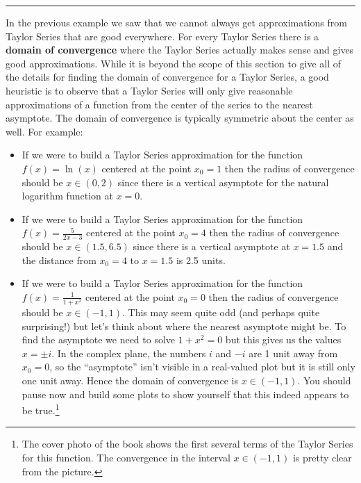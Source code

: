 \documentclass[
]{book}
\providecommand{\tightlist}{%
  \setlength{\itemsep}{0pt}\setlength{\parskip}{0pt}}
\theoremstyle{definition}
\theoremstyle{definition}
\theoremstyle{definition}
\theoremstyle{remark}
\begin{document}
\begin{center}\rule{0.5\linewidth}{0.5pt}\end{center}

In the previous example we saw that we cannot always get approximations from Taylor Series that are good everywhere. For every Taylor Series there is a \textbf{domain of convergence} where the Taylor Series actually makes sense and gives good approximations. While it is beyond the scope of this section to give all of the details for finding the domain of convergence for a Taylor Series, a good heuristic is to observe that a Taylor Series will only give reasonable approximations of a function from the center of the series to the nearest asymptote. The domain of convergence is typically symmetric about the center as well. For example:

\begin{itemize}
\tightlist
\item
  If we were to build a Taylor Series approximation for the function \(f(x) = \ln(x)\) centered at the point \(x_0 = 1\) then the radius of convergence should be \(x \in (0,2)\) since there is a vertical asymptote for the natural logarithm function at \(x=0\).
\item
  If we were to build a Taylor Series approximation for the function \(f(x) = \frac{5}{2x-3}\) centered at the point \(x_0 = 4\) then the radius of convergence should be \(x \in (1.5, 6.5)\) since there is a vertical asymptote at \(x=1.5\) and the distance from \(x_0 = 4\) to \(x=1.5\) is 2.5 units.\\
\item
  If we were to build a Taylor Series approximation for the function \(f(x) = \frac{1}{1+x^2}\) centered at the point \(x_0 = 0\) then the radius of convergence should be \(x \in (-1,1)\). This may seem quite odd (and perhaps quite surprising!) but let's think about where the nearest asymptote might be. To find the asymptote we need to solve \(1+x^2 = 0\) but this gives us the values \(x = \pm i\). In the complex plane, the numbers \(i\) and \(-i\) are 1 unit away from \(x_0 = 0\), so the ``asymptote'' isn't visible in a real-valued plot but it is still only one unit away. Hence the domain of convergence is \(x \in (-1,1)\). You should pause now and build some plots to show yourself that this indeed appears to be true.\footnote{The cover photo of the book shows the first several terms of the Taylor Series for this function. The convergence in the interval \(x \in (-1,1)\) is pretty clear from the picture.}
\end{itemize}
\end{document}
